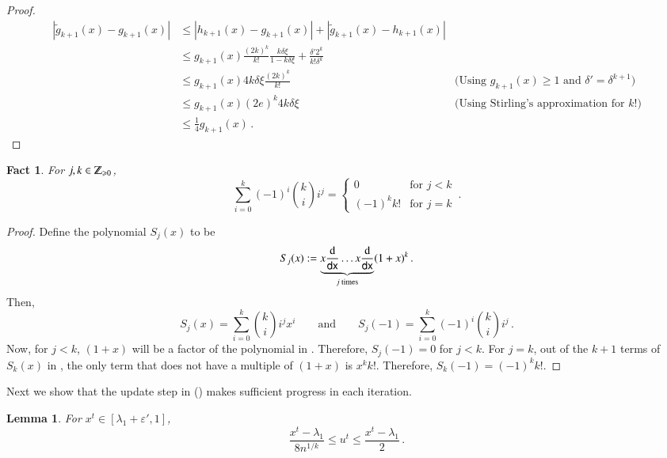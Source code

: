\documentclass{article}[12pt]
\newtheorem{lemma}[theorem]{Lemma}
\newtheorem{fact}[theorem]{Fact}
\theoremstyle{definition}
\renewcommand{\mathbb}{\varmathbb}
\renewcommand{\leq}{\leqslant}
\renewcommand{\geq}{\geqslant}
\newcommand{\mper}{\,.}
\newcommand{\Abs}[1]{\left\lvert#1\right\rvert}
\newcommand{\defeq}{\stackrel{\textup{def}}{=}}
\newcommand{\N}{{\mathbb Z}_{\geq 0}}
\newcommand{\e}{\epsilon}
\let\e\varepsilon
\renewcommand{\defeq}{:=}
\newcommand{\mom}{g}
\newcommand*\diff{\mathop{}\!\mathrm{d}}
\newcommand{\dx}{{\sf dx}}
\newcommand{\tg}{\tilde{g}}
\newcommand{\ut}{u^t}
\newcommand{\eprime}{\e'}
\begin{document}
\begin{proof}
\begin{align*}
\Abs{\tg_{k+1}(x) - \mom_{k+1}(x)} & \leq \Abs{h_{k+1}(x) - \mom_{k+1}(x)} + \Abs{\tg_{k+1}(x) - h_{k+1}(x)} \\
 & \leq \mom_{k+1}(x)  \frac{(2k)^k}{k!} \frac{k \delta \xi}{1 - k \delta \xi} + \frac{\delta' 2^k}{k! \delta^k} \\
 & \leq \mom_{k+1}(x) 4 k \delta \xi \frac{(2k)^k}{k!} & \textrm{(Using $g_{k+1}(x) \geq 1$ and $\delta' = \delta^{k+1} $)} \\
 & \leq \mom_{k+1}(x) (2e)^k 4 k \delta \xi & \textrm{(Using Stirling's approximation for $k!$)} \\
 & \leq \frac{1}{4} \mom_{k+1}(x) \mper
\end{align*}



\end{proof}

\begin{fact}
\label{fact:sjseries}
For $j,k \in \N$,   
\[ \sum_{i = 0}^{k} (-1)^i \binom{k}{i} i^j  = 
	\begin{cases} 0 & \textrm{for } j < k \\ (-1)^k k! & \textrm{for } j = k	\end{cases}  \mper \]
\end{fact}

\begin{proof}
Define the polynomial $S_j(x)$ to be
\begin{equation}
\label{eq:Sjdifferentiation} 
S_j(x) \defeq \underbrace{ x \frac{\diff}{\dx} \ldots x\frac{\diff }{\dx}  }_{j \textrm{ times}} 
		(1+x)^k \mper
\end{equation}
Then,
\[ S_j(x) = \sum_{i = 0}^k \binom{k}{i} i^j x^i  \qquad \textrm{and} \qquad 
 S_j(-1) = \sum_{i = 0}^{k} (-1)^i \binom{k}{i} i^j \mper  \]
Now, for $j < k$, $(1+x)$ will be a factor of the polynomial in .
Therefore,  $S_j(-1) = 0$ for $j <k$.
For $j=k$, out of the $k+1$ terms of $S_k(x)$ in , the only term that does not have
a multiple of $(1+x)$ is $x^k k!$. Therefore, $S_k(-1) = (-1)^k k!$.
\end{proof}

Next we show that the update step in  ()
makes sufficient progress in each iteration.

\begin{lemma}
\label{lem:noofits2}
For $x^t \in [\lambda_1 + \eprime,1]$,
\[ \frac{x^t - \lambda_1}{8 n^{1/k}}
 \leq \ut  \leq \frac{x^t - \lambda_1}{2} \mper \]
\end{lemma}
\end{document}
